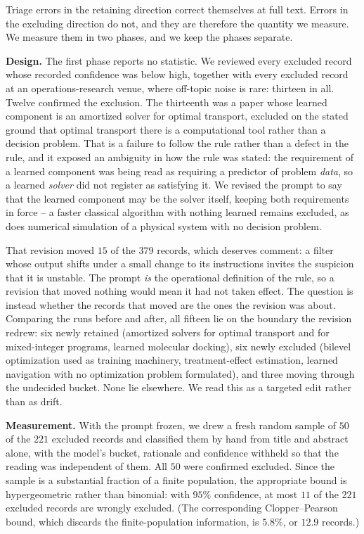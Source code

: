 Triage errors in the retaining direction correct themselves at full text. Errors in the excluding
direction do not, and they are therefore the quantity we measure. We measure them in two phases, and
we keep the phases separate.

\textbf{Design.} The first phase reports no statistic. We reviewed every excluded record whose
recorded confidence was below high, together with every excluded record at an operations-research
venue, where off-topic noise is rare: thirteen in all. Twelve confirmed the exclusion. The thirteenth
was a paper whose learned component is an amortized solver for optimal transport, excluded on the
stated ground that optimal transport there is a computational tool rather than a decision problem.
That is a failure to follow the rule rather than a defect in the rule, and it exposed an ambiguity in
how the rule was stated: the requirement of a learned component was being read as requiring a
predictor of problem \emph{data}, so a learned \emph{solver} did not register as satisfying it. We
revised the prompt to say that the learned component may be the solver itself, keeping both
requirements in force -- a faster classical algorithm with nothing learned remains excluded, as does
numerical simulation of a physical system with no decision problem.

That revision moved \(15\) of the \(379\) records, which deserves comment: a filter whose output
shifts under a small change to its instructions invites the suspicion that it is unstable. The prompt
\emph{is} the operational definition of the rule, so a revision that moved nothing would mean it had
not taken effect. The question is instead whether the records that moved are the ones the revision
was about. Comparing the runs before and after, all fifteen lie on the boundary the revision redrew:
six newly retained (amortized solvers for optimal transport and for mixed-integer programs, learned
molecular docking), six newly excluded (bilevel optimization used as training machinery,
treatment-effect estimation, learned navigation with no optimization problem formulated), and three
moving through the undecided bucket. None lie elsewhere. We read this as a targeted edit rather than
as drift.

\textbf{Measurement.} With the prompt frozen, we drew a fresh random sample of \(50\) of the \(221\)
excluded records and classified them by hand from title and abstract alone, with the model's bucket,
rationale and confidence withheld so that the reading was independent of them. All \(50\) were
confirmed excluded. Since the sample is a substantial fraction of a finite population, the
appropriate bound is hypergeometric rather than binomial: with \(95\%\) confidence, at most \(11\) of
the \(221\) excluded records are wrongly excluded. (The corresponding Clopper--Pearson bound, which
discards the finite-population information, is \(5.8\%\), or \(12.9\) records.)

